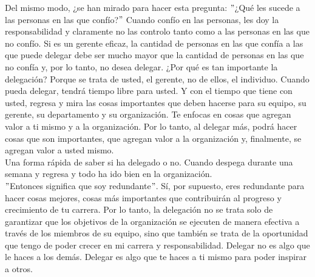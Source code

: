 \documentclass[10pt]{book}
\begin{document}
Del mismo modo, ¿se han mirado para hacer esta pregunta: $"$¿Qué les sucede a las personas en las que confío?$"$ Cuando confío en las personas, les doy la responsabilidad y claramente no las controlo tanto como a las personas en las que no confío. Si es un gerente eficaz, la cantidad de personas en las que confía a las que puede delegar debe ser mucho mayor que la cantidad de personas en las que no confía y, por lo tanto, no desea delegar. ¿Por qué es tan importante la delegación? Porque se trata de usted, el gerente, no de ellos, el individuo. Cuando pueda delegar, tendrá tiempo libre para usted. Y con el tiempo que tiene con usted, regresa y mira las cosas importantes que deben hacerse para su equipo, su gerente, su departamento y su organización. Te enfocas en cosas que agregan valor a ti mismo y a la organización. Por lo tanto, al delegar más, podrá hacer cosas que son importantes, que agregan valor a la organización y, finalmente, se agregan valor a usted mismo.\\
Una forma rápida de saber si ha delegado o no. Cuando despega durante una semana y regresa y todo ha ido bien en la organización.\\
$"$Entonces significa que soy redundante$"$. Sí, por supuesto, eres redundante para hacer cosas mejores, cosas más importantes que contribuirán al progreso y crecimiento de tu carrera. Por lo tanto, la delegación no se trata solo de garantizar que los objetivos de la organización se ejecuten de manera efectiva a través de los miembros de su equipo, sino que también se trata de la oportunidad que tengo de poder crecer en mi carrera y responsabilidad. Delegar no es algo que le haces a los demás. Delegar es algo que te haces a ti mismo para poder inspirar a otros.
\end{document}
